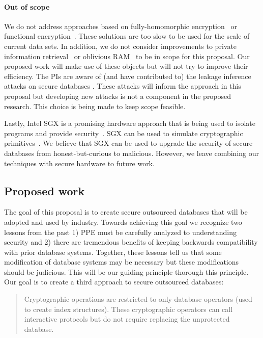 \paragraph{Out of scope} We do not address approaches based on fully-homomorphic encryption~\cite{STOC:Gentry09} or functional encryption~\cite{FOCS:GGHRSW13}.  These solutions are too slow to be used for the scale of current data sets.  In addition, we do not consider improvements to private information retrieval~\cite{FOCS:CGKS95} or oblivious RAM~\cite{STOC:Goldreich87,goldreich1996software} to be in scope for this proposal.  Our proposed work will make use of these objects but will not try to improve their efficiency.  The PIs are aware of (and have contributed to) the leakage inference attacks on secure databases .  These attacks will inform the approach in this proposal but developing new attacks is not a component in the proposed research.  This choice is being made to keep scope feasible.

Lastly, Intel SGX is a promising hardware approach that is being used to isolate programs and provide security~\cite{EPRINT:CosDev16}.  SGX can be used to simulate cryptographic primitives~\cite{EPRINT:SasGorFle17,EPRINT:FVBG16}.  We believe that SGX can be used to upgrade the security of secure databases from honest-but-curious to malicious.  However, we leave combining our techniques with secure hardware to future work.


\subsection{Proposed work}
The goal of this proposal is to create secure outsourced databases that will be adopted and used by industry.  Towards achieving this goal we recognize two lessons from the past 1) PPE must be carefully analyzed to understanding security and 2) there are tremendous benefits of keeping backwards compatibility with prior database systems.  Together, these lessons tell us that some modification of database systems may be necessary but these modifications should be judicious.  This will be our guiding principle thorough this principle.  Our goal is to create a third approach to secure outsourced databases: 
\begin{quote}Cryptographic operations are restricted to only database operators (used to create index structures).  These cryptographic operators can call interactive protocols but do not require replacing the unprotected database. 
\end{quote}

